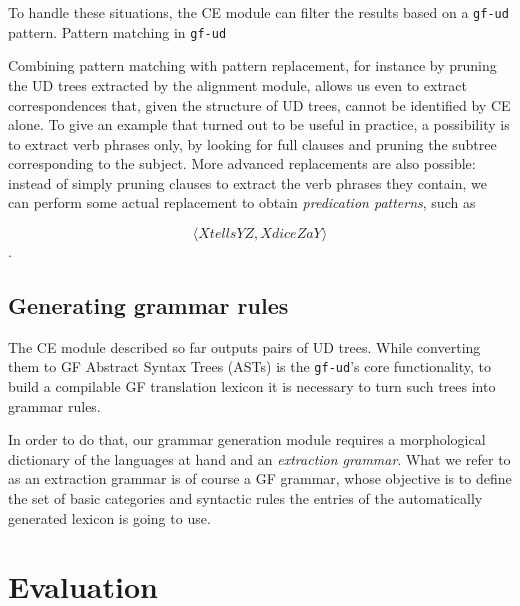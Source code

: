 \documentclass[11pt]{article}
\begin{document}
To handle these situations, the CE module can filter the results based on a \texttt{gf-ud} pattern.
Pattern matching in \texttt{gf-ud} %

Combining pattern matching with pattern replacement, for instance by pruning the UD trees extracted by the alignment module, allows us even to extract correspondences that, given the structure of UD trees, cannot be identified by CE alone. 
To give an example that turned out to be useful in practice, a possibility is to extract verb phrases only, by looking for full clauses and pruning the subtree corresponding to the subject. 
More advanced replacements are also possible: instead of simply pruning clauses to extract the verb phrases they contain, we can perform some actual replacement to obtain \textit{predication patterns}, such as

$$\langle X tells Y Z, X dice Z a Y\rangle$$.


\subsection{Generating grammar rules}
The CE module described so far outputs pairs of UD trees. 
While converting them to GF Abstract Syntax Trees (ASTs) is the \texttt{gf-ud}'s core functionality, to build a compilable GF translation lexicon it is necessary to turn such trees into grammar rules.

In order to do that, our grammar generation module requires a morphological dictionary of the languages at hand and an \textit{extraction grammar}. 
What we refer to as an extraction grammar is of course a GF grammar, whose
objective is to define the set of basic categories and syntactic rules the entries of the automatically generated lexicon is going to use.



\section{Evaluation} \label{evaluation}
\end{document}
